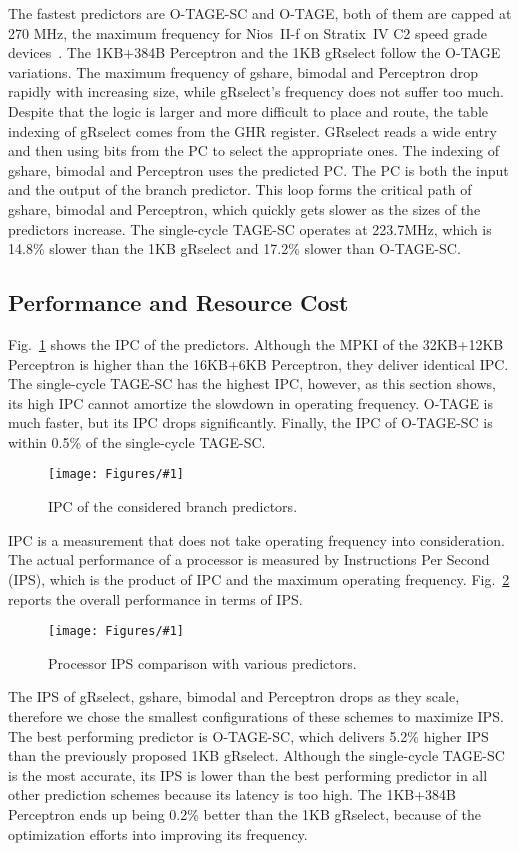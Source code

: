 \documentclass[conference]{IEEEtran}
\newcommand{\kfig}[4]{ %
        \begin{figure}[!t]
        \centering
        \texttt{[image: Figures/\#1]}
        \vspace{-1mm}
        \caption{#3}
        \vspace{-6mm}
        \label{#2}
        \end{figure}
}
\begin{document}
The fastest predictors are \mbox{O-TAGE-SC} and \mbox{O-TAGE}, both of them are capped at 270 MHz, the maximum frequency for Nios~II-f on Stratix~IV C2 speed grade devices~\cite{niosfmax}. The 1KB+384B Perceptron and the 1KB gRselect follow the \mbox{O-TAGE} variations. The maximum frequency of gshare, bimodal and Perceptron drop rapidly with increasing size, while gRselect's frequency does not suffer too much. Despite that the logic is larger and more difficult to place and route,  the table indexing of gRselect comes from the GHR register. GRselect reads a wide entry and then using bits from the PC to select the appropriate ones. The indexing of gshare, bimodal and Perceptron uses  the predicted PC. The PC is both the input and the output of the branch predictor. This loop forms the critical path of gshare, bimodal and Perceptron, which quickly gets slower as the sizes of the predictors increase. The single-cycle \mbox{TAGE-SC} operates at 223.7MHz, which is 14.8\% slower than the 1KB gRselect and 17.2\% slower than \mbox{O-TAGE-SC}.

\subsection{Performance and Resource Cost}
\label{sec:eval:perf}
Fig.~\ref{fig:adipc} shows the IPC of the predictors. Although the MPKI of the 32KB+12KB Perceptron is higher than the 16KB+6KB Perceptron, they deliver identical IPC. The single-cycle \mbox{TAGE-SC} has the highest IPC, however, as this section shows, its high IPC cannot amortize the slowdown in operating frequency. \mbox{O-TAGE} is much faster, but its IPC drops significantly. Finally, the IPC of \mbox{O-TAGE-SC} is within 0.5\% of the single-cycle \mbox{TAGE-SC}.
\kfig{adipc.pdf}{fig:adipc}{IPC of the considered branch predictors.}{angle = 0, trim = 0.9in 2.9in 0.8in 2.9in, clip, width=0.5\textwidth}

IPC is a measurement that does not take operating frequency into consideration. The actual performance of a processor is measured by Instructions Per Second (IPS), which is the product of IPC and the maximum operating frequency. Fig.~\ref{fig:adips} reports the overall performance in terms of IPS.
\kfig{adips.pdf}{fig:adips}{Processor IPS comparison with various predictors.}{angle = 0, trim = 0.9in 2.7in 0.7in 2.6in, clip, width=0.5\textwidth}

The IPS of gRselect, gshare, bimodal and Perceptron drops as they scale, therefore we chose the smallest configurations of these schemes to maximize IPS. The best performing predictor is \mbox{O-TAGE-SC}, which delivers 5.2\% higher IPS than the previously proposed 1KB gRselect. Although the single-cycle \mbox{TAGE-SC} is the most accurate, its IPS is lower than the best performing predictor in all other prediction schemes  because its latency is too high. The 1KB+384B Perceptron ends up being 0.2\% better than the 1KB gRselect, because of the optimization efforts into improving its frequency. 
\end{document}
